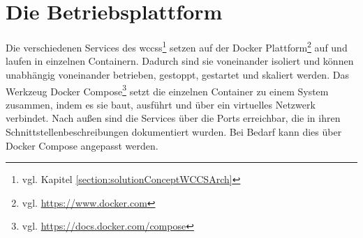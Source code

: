 \section{Die Betriebsplattform}
    Die verschiedenen Services des
    \glspl{wccs}\footnote{vgl. Kapitel \ref{section:solutionConceptWCCSArch}}
    setzen auf der Docker Plattform\footnote{vgl. \url{https://www.docker.com}} auf
    und laufen in einzelnen Containern.
    Dadurch sind sie voneinander isoliert und können unabhängig voneinander
    betrieben, gestoppt, gestartet und skaliert werden.
    Das Werkzeug Docker Compose\footnote{vgl. \url{https://docs.docker.com/compose}}
    setzt die einzelnen Container zu einem System zusammen,
    indem es sie baut, ausführt und über ein virtuelles Netzwerk verbindet.
    Nach außen sind die Services über die Ports erreichbar,
    die in ihren Schnittstellenbeschreibungen dokumentiert wurden.
    Bei Bedarf kann dies über Docker Compose angepasst werden.
